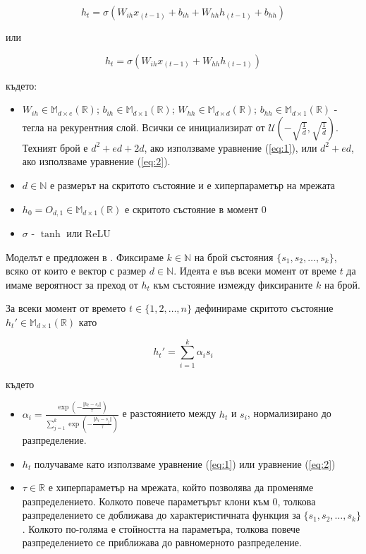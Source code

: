 \documentclass[a4paper,12pt]{article}
\begin{document}
\begin{equation} \label{eq:1}
h_t = \sigma(W_{ih} x_{(t-1)} + b_{ih} + W_{hh} h_{(t-1)} + b_{hh})
\end{equation}

или 

\begin{equation} \label{eq:2}
h_t = \sigma(W_{ih} x_{(t-1)} + W_{hh} h_{(t-1)})
\end{equation}

където:

\begin{itemize}
\item $W_{ih} \in \mathbb{M}_{d \times e} (\mathbb{R})$; $b_{ih} \in \mathbb{M}_{d \times 1} (\mathbb{R})$; $W_{hh} \in \mathbb{M}_{d \times d} (\mathbb{R})$; $b_{hh} \in \mathbb{M}_{d \times 1} (\mathbb{R})$ - тегла на рекурентния слой. Всички се инициализират от $\mathcal{U}(-\sqrt{\frac{1}{d}}, \sqrt{\frac{1}{d}})$. Техният брой е $d^2 + ed + 2d$, ако използваме уравнение (\ref{eq:1}), или $d^2 + ed$, ако използваме уравнение (\ref{eq:2}).
\item $d \in \mathbb{N}$ е размерът на скритото състояние и е хиперпараметър на мрежата
\item $h_0 = O_{d, 1} \in \mathbb{M}_{d \times 1} (\mathbb{R})$ е скритото състояние в момент 0
\item $\sigma$ - $\tanh$ или ReLU
\end{itemize}

Моделът е предложен в \cite{citation06}. Фиксираме $k \in \mathbb{N}$ на брой състояния $\{s_1, s_2, \ldots, s_k\}$, всяко от които е вектор с размер $d \in \mathbb{N}$. Идеята е във всеки момент от време $t$ да имаме вероятност за преход от $h_t$ към състояние измежду фиксираните $k$ на брой. 

За всеки момент от времето $t \in \{1, 2, \ldots, n\}$ дефинираме скритото състояние $h_t' \in \mathbb{M}_{d \times 1} (\mathbb{R})$ като

\begin{equation}
h_t' = {\sum_{i=1}^{k} \alpha_{i} s_i}
\end{equation}

където

\begin{itemize}
 \item $\alpha_{i} = \frac{\exp \left(- \frac{\Vert{h_t - s_i}\Vert}{\tau}\right)}{\displaystyle\sum_{j=1}^{k} \exp \left(- \frac{\Vert{h_t - s_j}\Vert}{\tau}\right)}$ е разстоянието между $h_t$ и $s_i$, нормализирано до разпределение.
 \item $h_t$ получаваме като използваме уравнение (\ref{eq:1}) или уравнение (\ref{eq:2})
 \item $\tau \in \mathbb{R}$ е хиперпараметър на мрежата, който позволява да променяме разпределението. Колкото повече параметърът клони към 0, толкова разпределението се доближава до характеристичната функция за $\{s_1, s_2, \ldots, s_k\}$. Колкото по-голяма е стойността на параметъра, толкова повече разпределението се приближава до равномерното разпределение.
\end{itemize}
\end{document}
